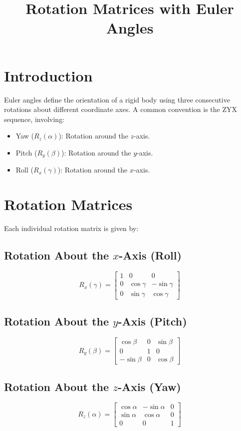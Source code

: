 \documentclass{article}
\title{Rotation Matrices with Euler Angles}
\author{}
\date{}
\begin{document}
\maketitle

\section{Introduction}
Euler angles define the orientation of a rigid body using three consecutive rotations about different coordinate axes. A common convention is the ZYX sequence, involving:
\begin{itemize}
    \item Yaw ($R_z(\alpha)$): Rotation around the $z$-axis.
    \item Pitch ($R_y(\beta)$): Rotation around the $y$-axis.
    \item Roll ($R_x(\gamma)$): Rotation around the $x$-axis.
\end{itemize}

\section{Rotation Matrices}
Each individual rotation matrix is given by:

\subsection{Rotation About the $x$-Axis (Roll)}
\begin{equation}
R_x(\gamma) =
\begin{bmatrix}
1 & 0 & 0 \\
0 & \cos\gamma & -\sin\gamma \\
0 & \sin\gamma & \cos\gamma
\end{bmatrix}
\end{equation}

\subsection{Rotation About the $y$-Axis (Pitch)}
\begin{equation}
R_y(\beta) =
\begin{bmatrix}
\cos\beta & 0 & \sin\beta \\
0 & 1 & 0 \\
-\sin\beta & 0 & \cos\beta
\end{bmatrix}
\end{equation}

\subsection{Rotation About the $z$-Axis (Yaw)}
\begin{equation}
R_z(\alpha) =
\begin{bmatrix}
\cos\alpha & -\sin\alpha & 0 \\
\sin\alpha & \cos\alpha & 0 \\
0 & 0 & 1
\end{bmatrix}
\end{equation}
\end{document}
